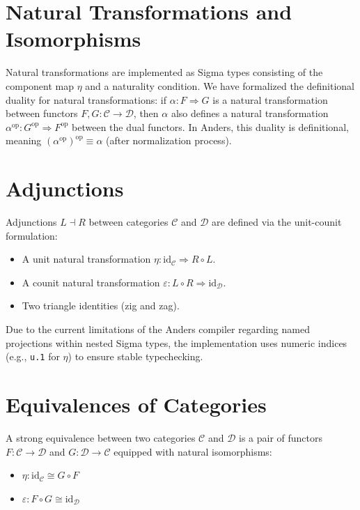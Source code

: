 \documentclass[11pt]{article}
\newcommand{\catC}{\mathcal{C}}
\newcommand{\catD}{\mathcal{D}}
\newcommand{\op}{^\text{op}}
\begin{document}
\section{Natural Transformations and Isomorphisms}

Natural transformations are implemented as Sigma types consisting of the component map $\eta$ and a naturality condition.
We have formalized the definitional duality for natural transformations: if $\alpha : F \Rightarrow G$ is a natural
transformation between functors $F, G : \catC \to \catD$, then $\alpha$ also defines a natural transformation
$\alpha\op : G\op \Rightarrow F\op$ between the dual functors. In Anders, this duality is definitional,
meaning $(\alpha\op)\op \equiv \alpha$ (after normalization process).

\section{Adjunctions}

Adjunctions $L \dashv R$ between categories $\catC$ and $\catD$ are defined via the unit-counit formulation:

\begin{itemize}
    \item A unit natural transformation $\eta : \text{id}_\catC \Rightarrow R \circ L$.
    \item A counit natural transformation $\varepsilon : L \circ R \Rightarrow \text{id}_\catD$.
    \item Two triangle identities (zig and zag).
\end{itemize}

Due to the current limitations of the Anders compiler regarding named projections within nested Sigma types,
the implementation uses numeric indices (e.g., \texttt{u.1} for $\eta$) to ensure stable typechecking.

\section{Equivalences of Categories}

A strong equivalence between two categories $\catC$ and $\catD$ is a pair of functors $F : \catC \to \catD$ and $G : \catD \to \catC$ equipped with natural isomorphisms:

\begin{itemize}
    \item $\eta : \text{id}_\catC \cong G \circ F$
    \item $\varepsilon : F \circ G \cong \text{id}_\catD$
\end{itemize}
\end{document}
